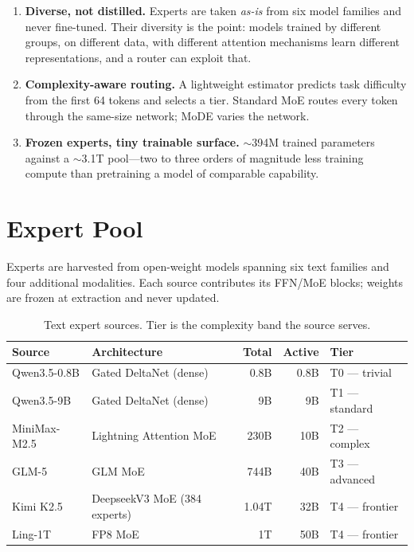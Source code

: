 \documentclass[11pt,a4paper]{article}
\begin{document}
\begin{enumerate}
  \item \textbf{Diverse, not distilled.} Experts are taken \emph{as-is} from six model
        families and never fine-tuned. Their diversity is the point: models trained by
        different groups, on different data, with different attention mechanisms learn
        different representations, and a router can exploit that.
  \item \textbf{Complexity-aware routing.} A lightweight estimator predicts task
        difficulty from the first 64 tokens and selects a tier. Standard MoE routes
        every token through the same-size network; MoDE varies the network.
  \item \textbf{Frozen experts, tiny trainable surface.} $\sim$394M trained parameters
        against a $\sim$3.1T pool---two to three orders of magnitude less training
        compute than pretraining a model of comparable capability.
\end{enumerate}

\section{Expert Pool}

Experts are harvested from open-weight models spanning six text families and four
additional modalities. Each source contributes its FFN/MoE blocks; weights are frozen at
extraction and never updated.

\begin{table}[H]
\centering
\caption{Text expert sources. Tier is the complexity band the source serves.}
\begin{tabular}{llrrl}
\toprule
\textbf{Source} & \textbf{Architecture} & \textbf{Total} & \textbf{Active} & \textbf{Tier} \\
\midrule
Qwen3.5-0.8B & Gated DeltaNet (dense)       & 0.8B  & 0.8B & T0 --- trivial \\
Qwen3.5-9B   & Gated DeltaNet (dense)       & 9B    & 9B   & T1 --- standard \\
MiniMax-M2.5 & Lightning Attention MoE      & 230B  & 10B  & T2 --- complex \\
GLM-5        & GLM MoE                      & 744B  & 40B  & T3 --- advanced \\
Kimi K2.5    & DeepseekV3 MoE (384 experts) & 1.04T & 32B  & T4 --- frontier \\
Ling-1T      & FP8 MoE                      & 1T    & 50B  & T4 --- frontier \\
\bottomrule
\end{tabular}
\end{table}
\end{document}
